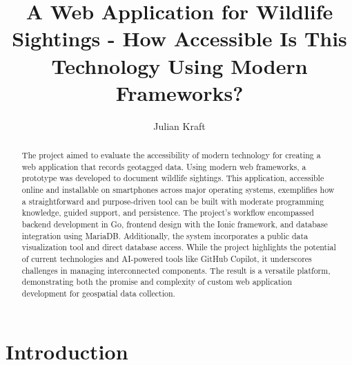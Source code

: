 \documentclass{josis}
\begin{document}

\title{A Web Application for Wildlife Sightings - How Accessible Is This Technology Using Modern Frameworks?}

\author{Julian Kraft}

\maketitle


\begin{abstract}

The project aimed to evaluate the accessibility of modern technology for creating a web application 
that records geotagged data. Using modern web frameworks, a prototype was developed to document wildlife sightings. 
This application, accessible online and installable on smartphones across major operating systems, 
exemplifies how a straightforward and purpose-driven tool can be built with moderate programming knowledge, 
guided support, and persistence. The project's workflow encompassed backend development in Go, 
frontend design with the Ionic framework, and database integration using MariaDB. Additionally, 
the system incorporates a public data visualization tool and direct database access. 
While the project highlights the potential of current technologies and AI-powered tools like GitHub Copilot, 
it underscores challenges in managing interconnected components. The result is a versatile platform, 
demonstrating both the promise and complexity of custom web application development for geospatial data collection.

\end{abstract}

\section{Introduction}
\end{document}

